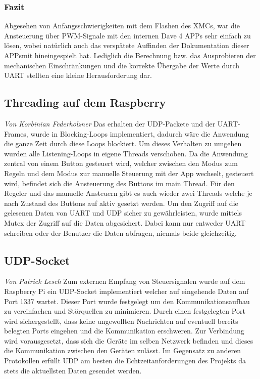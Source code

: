 \documentclass[12pt,a4paper,bibliography=totoc,listof=totoc]{scrartcl}
\begin{document}
\subsubsection{Fazit}
Abgesehen von Anfangsschwierigkeiten mit dem Flashen des XMCs, war die Ansteuerung über PWM-Signale 
mit den internen Dave 4 APPs sehr einfach zu lösen, wobei natürlich auch das verspätete Auffinden der Dokumentation dieser APPsmit hineingespielt hat. 
Lediglich die Berechnung bzw. das Ausprobieren der mechanischen Einschränkungen und die korrekte Übergabe der Werte durch UART stellten eine kleine Herausforderung dar. 

\subsection{Threading auf dem Raspberry}
\textit{Von Korbinian Federholzner}\newline
Das erhalten der UDP-Packete und der UART-Frames, wurde in Blocking-Loops implementiert, dadurch wäre die Anwendung 
die ganze Zeit durch diese Loops blockiert. Um dieses Verhalten zu umgehen wurden alle Listening-Loops in eigene Threads
verschoben. Da die Anwendung zentral von einem Button gesteuert wird, welcher zwischen den Modus zum Regeln und dem 
Modus zur manuelle Steuerung mit der App wechselt, gesteuert wird, befindet sich die Ansteuerung des Buttons im main Thread.
Für den Regeler und das manuelle Ansteuern gibt es auch wieder zwei Threads welche je nach Zustand des Buttons auf 
aktiv gesetzt werden. Um den Zugriff auf die gelesenen Daten von UART und UDP sicher zu gewährleisten, wurde mittels 
Mutex der Zugriff auf die Daten abgesichert. Dabei kann nur entweder UART schreiben oder der Benutzer die Daten abfragen,
niemals beide gleichzeitig.


\subsection{UDP-Socket} \label{subsec:UDPsocket}
\textit{Von Patrick Lesch}\newline
Zum externen Empfang von Steuersignalen wurde auf dem Raspberry Pi ein UDP-Socket implementiert welcher auf eingehende Daten auf
Port 1337 wartet. Dieser Port wurde festgelegt um den Kommunikationsaufbau zu vereinfachen und Störquellen zu minimieren. Durch 
einen festgelegten Port wird sichergestellt, dass keine ungewollten Nachrichten auf eventuell bereits belegten Ports eingehen und die 
Kommunikation erschweren. Zur Verbindung wird vorausgesetzt, dass sich die Geräte im selben Netzwerk befinden und dieses die Kommunikation
zwischen den Geräten zulässt. Im Gegensatz zu anderen Protokollen erfüllt UDP am besten die Echtzeitanforderungen des Projekts da stets
die aktuellsten Daten gesendet werden. 
\end{document}
